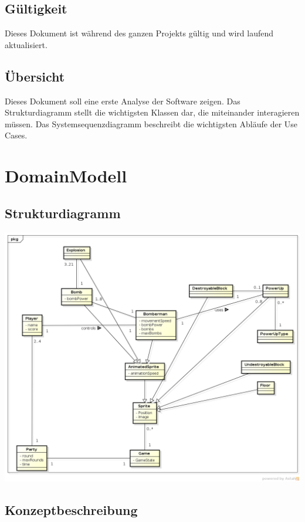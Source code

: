 \documentclass[11pt]{scrartcl}
\begin{document}
\subsection{Gültigkeit}
\label{sec:Gültigkeit}
Dieses Dokument ist während des ganzen Projekts gültig und wird laufend aktualisiert.

\subsection{Übersicht}
\label{sec:Übersicht}
Dieses Dokument soll eine erste Analyse der Software zeigen. Das Strukturdiagramm stellt die wichtigsten Klassen dar, die miteinander interagieren müssen. Das Systemsequenzdiagramm beschreibt die wichtigsten Abläufe der Use Cases.

\newpage
\section{DomainModell}
\label{sec:DomainModell}
\subsection{Strukturdiagramm}
\label{sec:Strukturdiagramm}

\begin{center}
\includegraphics[scale=0.5]{Strukturdiagramm_JBomberman} 
\end{center}

\newpage

\subsection{Konzeptbeschreibung}
\label{sec:Konzeptbeschreibung}
\end{document}
